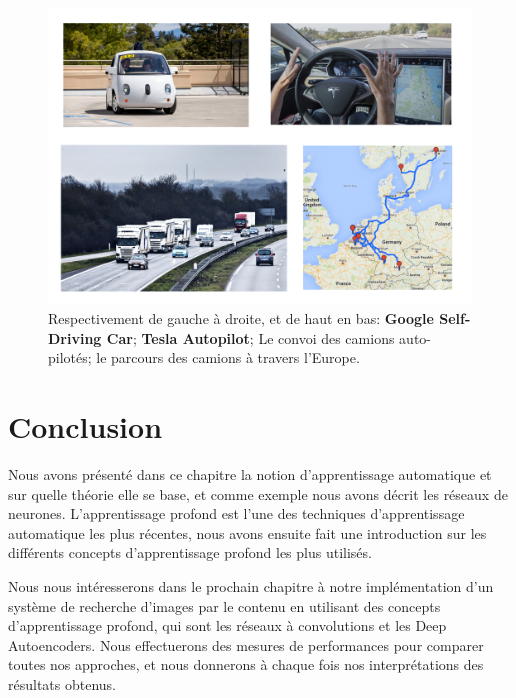 \begin{figure}[H]
	\centering
		\includegraphics[width=5in]{Figures/selfDriving.png}
	\caption[An Electron]{Respectivement de gauche à droite, et de haut en bas: \textbf{Google Self-Driving Car}; \textbf{Tesla Autopilot}; Le convoi des camions auto-pilotés; le parcours des camions à travers l'Europe.}
	\label{fig:Electron}
\end{figure}


\section{Conclusion}

	Nous avons présenté dans ce chapitre la notion d'apprentissage automatique et sur quelle théorie elle se base, et comme exemple nous avons décrit les réseaux de neurones. L'apprentissage profond est l'une des techniques d'apprentissage automatique les plus récentes, nous avons ensuite fait une introduction sur les différents concepts d'apprentissage profond les plus utilisés.
	
	Nous nous intéresserons dans le prochain chapitre à notre implémentation d'un système de recherche d'images par le contenu en utilisant des concepts d'apprentissage profond, qui sont les réseaux à convolutions et les Deep Autoencoders. Nous effectuerons des mesures de performances pour comparer toutes nos approches, et nous donnerons à chaque fois nos interprétations des résultats obtenus.

